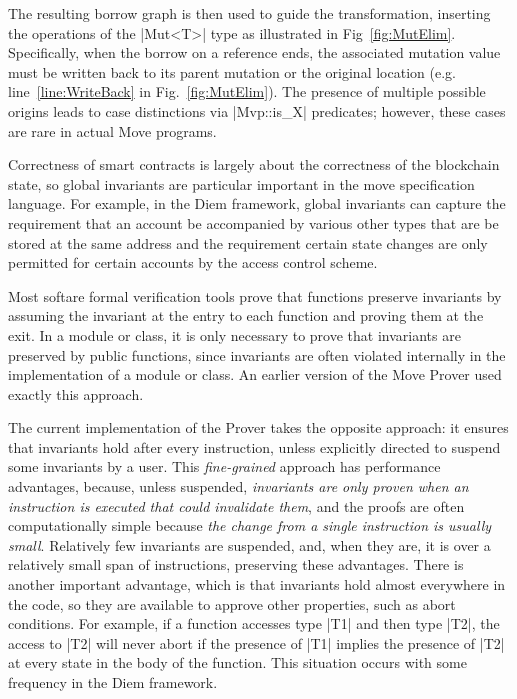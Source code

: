 The resulting borrow graph is then used to guide the transformation, inserting
the operations of the |Mut<T>| type as illustrated in
Fig~\ref{fig:MutElim}. Specifically, when the borrow on a reference ends, the
associated mutation value must be written back to its parent mutation or the
original location (e.g. line~\ref{line:WriteBack} in
Fig.~\ref{fig:MutElim}). The presence of multiple possible origins leads to case
distinctions via |Mvp::is_X| predicates; however, these cases are rare in actual
Move programs.


\label{sec:GlobalInvariants}

Correctness of smart contracts is largely about the correctness of the
blockchain state, so global invariants are particular important in the
move specification language.  For example, in the Diem framework,
global invariants can capture the requirement that an account be
accompanied by various other types that are be stored at the same
address and the requirement certain state changes are only permitted
for certain accounts by the access control scheme.

Most softare formal verification tools prove that functions preserve
invariants by assuming the invariant at the entry to each function and
proving them at the exit.  In a module or class, it is only necessary
to prove that invariants are preserved by public functions, since
invariants are often violated internally in the implementation of a module or
class. An earlier version of the Move Prover used exactly this approach.

The current implementation of the Prover takes the opposite approach:
it ensures that invariants hold after every instruction, unless
explicitly directed to suspend some invariants by a user.  This
\emph{fine-grained} approach has performance advantages, because,
unless suspended,
\emph{invariants are only proven when an instruction is executed that could
invalidate them}, and the proofs are often computationally simple
because \emph{the change from a single instruction is usually small}.
Relatively few invariants are suspended, and, when they are, it is
over a relatively small span of instructions, preserving these advantages.
There is another important advantage, which is that invariants hold
almost everywhere in the code, so they are available to approve other
properties, such as abort conditions. For example, if a function
accesses type |T1| and then type |T2|, the access to |T2| will
never abort if the presence of |T1|
implies the presence of |T2| at every state in the body of the function.
This situation occurs with some frequency in the Diem framework.

